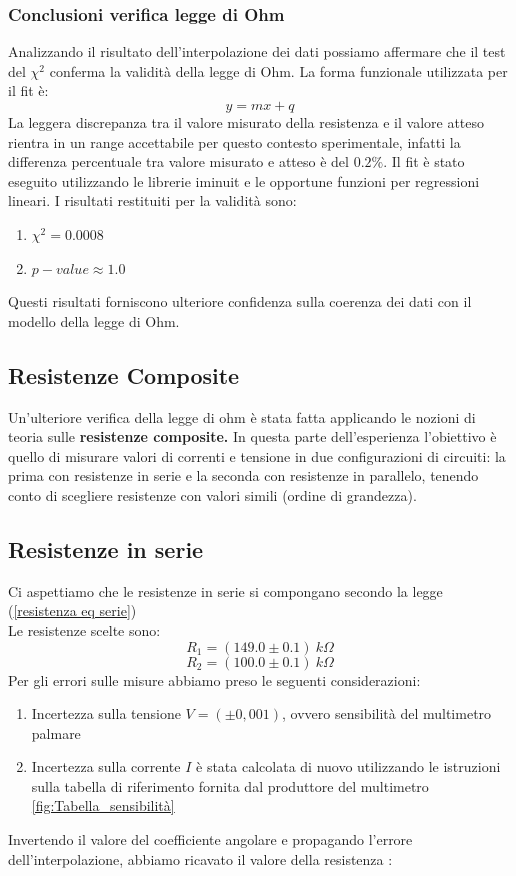 \documentclass[letterpaper,12pt]{article}
\begin{document}
\subsubsection{Conclusioni verifica legge di Ohm}
Analizzando il risultato dell'interpolazione dei dati possiamo affermare che il test del $\chi^2$ conferma la validità della legge di Ohm. La forma funzionale utilizzata per il fit è: $$y=mx+q$$
La leggera discrepanza tra il valore misurato della resistenza e il valore atteso rientra in un range accettabile per questo contesto sperimentale, infatti la differenza percentuale tra valore misurato e atteso è del $0.2\%$. Il fit è stato eseguito utilizzando le librerie iminuit e le opportune funzioni per regressioni lineari. I risultati restituiti per la validità sono:
\begin{enumerate}
    \item $\chi^2 = 0.0008$
    \item $p-value \approx 1.0$
\end{enumerate}
Questi risultati forniscono ulteriore confidenza sulla coerenza dei dati con il modello della legge di Ohm.



\subsection{Resistenze Composite}
Un'ulteriore verifica della legge di ohm è stata fatta applicando le nozioni di teoria sulle \textbf{resistenze composite.} In questa parte dell'esperienza l'obiettivo è quello di misurare valori di correnti e tensione in due configurazioni di circuiti: la prima con resistenze in serie e la seconda con resistenze in parallelo, tenendo conto di scegliere resistenze con valori simili (ordine di grandezza).



\subsection{Resistenze in serie}
Ci aspettiamo che le resistenze in serie si compongano secondo la legge (\ref{resistenza eq serie})\\
Le resistenze scelte sono: $$R_1 = (149.0\pm0.1)\  k\Omega$$
$$R_2 = (100.0\pm0.1)\  k\Omega$$
Per gli errori sulle misure abbiamo preso le seguenti considerazioni: 
\begin{enumerate}
\item Incertezza sulla tensione $V=(\pm0,001)$, ovvero sensibilità del multimetro palmare
\item Incertezza sulla corrente $I$ è stata calcolata di nuovo utilizzando le istruzioni sulla tabella di riferimento fornita dal produttore del multimetro \ref{fig:Tabella_sensibilità}
\end{enumerate}
\vspace{20pt}
Invertendo il valore del coefficiente angolare e propagando l'errore dell'interpolazione, abbiamo ricavato il valore della resistenza :
\end{document}
